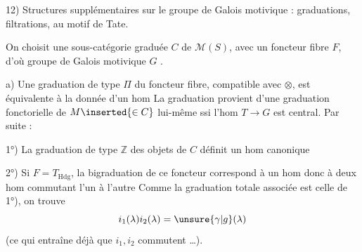 12) Structures supplémentaires sur le groupe de Galois
motivique : 
graduations, filtrations, au motif de Tate.

On choisit une sous-\inserted{$\otimes$-}catégorie graduée
$C$ de $\mathcal{M}(S)$, avec un foncteur fibre $F$,
d'où groupe de Galois motivique $G$
.

a) Une graduation de type $\Pi$ du foncteur fibre,
compatible avec $\otimes$, est équivalente à la donnée
d'un hom
La graduation provient d'une graduation fonctorielle
de $M\inserted{\in C}$ lui-même ssi l'hom $T\longrightarrow G$ est
central. Par suite :

1°) La graduation  de type $\mathbb{Z}$ des objets de
$C$ définit un hom canonique

2°) Si $F=T_{\mathrm{Hdg}}$, la bigraduation de ce
foncteur correspond à un hom
donc à deux hom commutant l'un à
l'autre
Comme la graduation totale associée est celle
de 1°), on trouve
\[
 i_1(\lambda)i_2(\lambda)=\unsure{\gamma|g}(\lambda)
\]
(ce qui entraîne déjà que $i_1,i_2$ commutent \dots).

